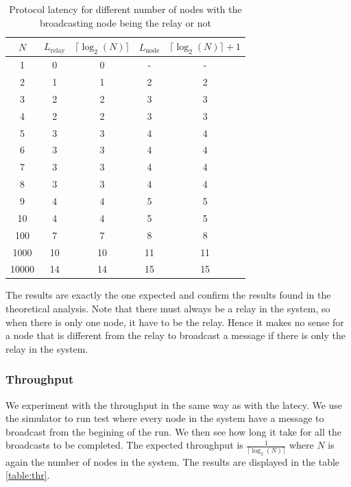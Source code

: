 \documentclass[a4paper]{article}
\begin{document}
\begin{table}[H]
\centering
\begin{tabular}{|c|c|c|c|c|}
    \hline
    $N$  & $L_{\text{relay}}$ & $\lceil\log_2(N)\rceil$ & $L_{\text{node}}$ & $\lceil\log_2(N)\rceil + 1$ \\
    \hline
    1     & 0    & 0    & -    & -    \\
    2     & 1    & 1    & 2    & 2    \\
    3     & 2    & 2    & 3    & 3    \\
    4     & 2    & 2    & 3    & 3    \\
    5     & 3    & 3    & 4    & 4    \\
    6     & 3    & 3    & 4    & 4    \\
    7     & 3    & 3    & 4    & 4    \\
    8     & 3    & 3    & 4    & 4    \\
    9     & 4    & 4    & 5    & 5    \\
    10    & 4    & 4    & 5    & 5    \\
    100   & 7    & 7    & 8    & 8    \\
    1000  & 10   & 10   & 11   & 11   \\
    10000 & 14   & 14   & 15   & 15   \\
    \hline
\end{tabular}
\caption{Protocol latency for different number of nodes with the broadcasting node being the relay or not}
\label{table:la}
\end{table}

The results are exactly the one expected and confirm the results found in the
theoretical analysis. Note that there must always be a relay in the system, so
when there is only one node, it have to be the relay. Hence it makes no sense
for a node that is different from the relay to broadcast a message if there is
only the relay in the system.

\subsubsection*{Throughput}
We experiment with the throughput in the same way as with the latecy. We use
the simulator to run test where every node in the system have a message to
broadcast from the begining of the run. We then see how long it take for all
the broadcasts to be completed. The expected throughput is
$\frac{1}{\lceil\log_2(N)\rceil}$ where $N$ is again the number of nodes in
the system. The results are displayed in the table \ref{table:thr}.
\end{document}
